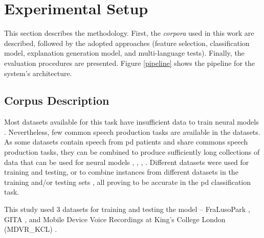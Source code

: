 
\chapter{Experimental Setup}
\label{ch:adipisci}



This section describes the methodology. First, the \textit{corpora} used in this work are described, followed by the adopted approaches (feature selection, classification model, explanation generation model, and multi-language tests). Finally, the evaluation procedures are presented. Figure \ref{pipeline} shows the pipeline for the system's architecture. 

\section{Corpus Description}

Most datasets available for this task have insufficient data to train neural models \cite{underfitting_small_datasets}. Nevertheless, few common speech production tasks are available in the datasets. 
As some datasets contain speech from \gls{pd} patients and share commons speech production tasks, they can be combined to produce sufficiently long collections of data that can be used for neural models \cite{parkinson_braga}, \cite{parkinson_acoustic_despotovic}, \cite{parkinson_phonemic_relevance}, \cite{x_vector_parkinson}. Different datasets were used for training and testing, or to combine instances from different datasets in the training and/or testing sets \cite{parkinson_three_languages}, all proving to be accurate in the \gls{pd} classification task.

This study used 3 datasets for training and testing the model -- FraLusoPark \cite{fralusopark}, GITA \cite{GITA}, and Mobile Device Voice Recordings at King's College London (MDVR\_KCL) \cite{MDVR}.

